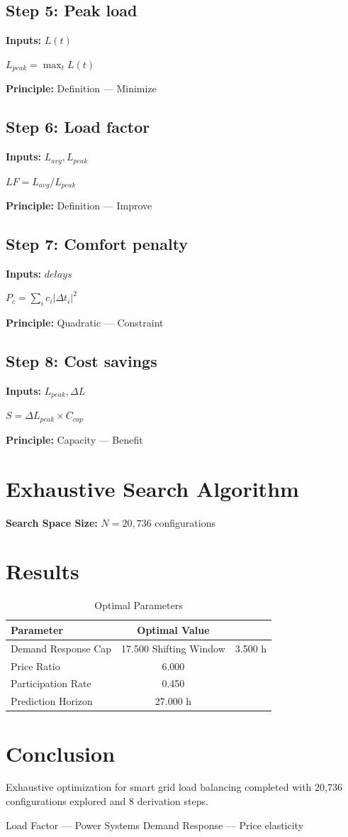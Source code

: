 \documentclass[11pt,twocolumn]{article}
\begin{document}
\subsection*{Step 5: Peak load}
\textbf{Inputs:} $L(t)$

$L_{peak} = \max_t L(t)$

\textbf{Principle:} Definition --- Minimize

\subsection*{Step 6: Load factor}
\textbf{Inputs:} $L_{avg}, L_{peak}$

$LF = L_{avg}/L_{peak}$

\textbf{Principle:} Definition --- Improve

\subsection*{Step 7: Comfort penalty}
\textbf{Inputs:} $delays$

$P_c = \sum_i c_i |\Delta t_i|^2$

\textbf{Principle:} Quadratic --- Constraint

\subsection*{Step 8: Cost savings}
\textbf{Inputs:} $L_{peak}, \Delta L$

$S = \Delta L_{peak} \times C_{cap}$

\textbf{Principle:} Capacity --- Benefit


\section{Exhaustive Search Algorithm}

\textbf{Search Space Size:} $N = 20,736$ configurations

\section{Results}

\begin{table}[h]
\centering
\caption{Optimal Parameters}
\begin{tabular}{@{}lc@{}}
\toprule
Parameter & Optimal Value \\
\midrule
Demand Response Cap & 17.500 %
Shifting Window & 3.500 h \\
Price Ratio & 6.000  \\
Participation Rate & 0.450  \\
Prediction Horizon & 27.000 h \\
\bottomrule
\end{tabular}
\end{table}

\section{Conclusion}
Exhaustive optimization for smart grid load balancing completed with 20,736 configurations explored and 8 derivation steps.

\begin{thebibliography}{9}
 Load Factor --- Power Systems
 Demand Response --- Price elasticity
\end{thebibliography}
\end{document}
